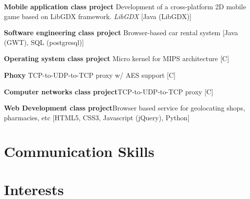 \documentclass[11pt,a4paper,sans]{moderncv} %
\begin{document}
 {\textbf{Mobile application class project} \newline Development of a cross-platform 2D mobile game based on LibGDX framework. {\em LibGDX} [Java (LibGDX)]}

 {\textbf{Software engineering class project} \newline Browser-based car rental system [Java (GWT), SQL (postgresql)]}

 {\textbf{Operating system class project} \newline Micro kernel for MIPS architecture [C]}

 {\textbf{Phoxy} \newline TCP-to-UDP-to-TCP proxy w/ AES support [C]}

 {\textbf{Computer networks class project}\newline TCP-to-UDP-to-TCP proxy [C]}

 {\textbf{Web Development class project}\newline Browser based service for geolocating shops, pharmacies, etc [HTML5, CSS3, Javascript (jQuery), Python]}



\section{Communication Skills}




\section{Interests}

\renewcommand{\listitemsymbol}{-~} %

\end{document}
